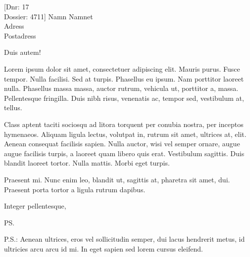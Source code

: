 \documentclass{kth-brev}
\begin{document}
\begin{letter}[Dnr: 17\\Dossier: 4711]
              {Namn Namnet\\
               Adress\\
               Postadress}
\opening{Duis autem!}

Lorem ipsum dolor sit amet, consectetuer adipiscing elit. Mauris
purus. Fusce tempor. Nulla facilisi. Sed at turpis. Phasellus eu
ipsum. Nam porttitor laoreet nulla. Phasellus massa massa, auctor
rutrum, vehicula ut, porttitor a, massa. Pellentesque fringilla. Duis
nibh risus, venenatis ac, tempor sed, vestibulum at, tellus.

Class aptent taciti sociosqu ad litora torquent per conubia nostra,
per inceptos hymenaeos. Aliquam ligula lectus, volutpat in, rutrum sit
amet, ultrices at, elit. Aenean consequat facilisis sapien. Nulla
auctor, wisi vel semper ornare, augue augue facilisis turpis, a
laoreet quam libero quis erat. Vestibulum sagittis. Duis blandit
laoreet tortor. Nulla mattis. Morbi eget turpis.

Praesent mi. Nunc enim leo, blandit ut, sagittis at, pharetra sit
amet, dui. Praesent porta tortor a ligula rutrum dapibus.

\closing{Integer pellentesque,}
\ps

P.S.:
Aenean ultrices, eros vel sollicitudin semper, dui lacus hendrerit
metus, id ultricies arcu arcu id mi. In eget sapien sed lorem cursus
eleifend.

\end{letter}
\end{document}
